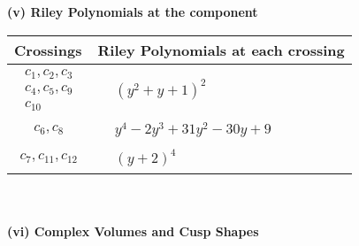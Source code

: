 \documentclass[1p]{elsarticle_modified}
\theoremstyle{definition}
\begin{document}
\newpage\renewcommand{\arraystretch}{1}
\flushleft \textbf{(v) Riley Polynomials at the component}\newline \\
\begin{tabular}{m{50pt}|m{274pt}}
Crossings & \hspace{64pt}Riley Polynomials at each crossing \\
\hline $$\begin{aligned}c_{1},c_{2},c_{3}\\c_{4},c_{5},c_{9}\\c_{10}\end{aligned}$$&$\begin{aligned}
&(y^2+y+1)^2
\end{aligned}$\\
\hline $$\begin{aligned}c_{6},c_{8}\end{aligned}$$&$\begin{aligned}
&y^4-2 y^3+31 y^2-30 y+9
\end{aligned}$\\
\hline $$\begin{aligned}c_{7},c_{11},c_{12}\end{aligned}$$&$\begin{aligned}
&(y+2)^4
\end{aligned}$\\
\hline
\end{tabular}\\~\\
\newpage\flushleft \textbf{(vi) Complex Volumes and Cusp Shapes}
\end{document}

